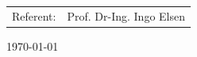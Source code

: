 \begin{titlepage}
	\centering \begin{minipage}[t]{9cm}
		\centering \begin{tabular}{ll}
			Referent: & Prof. Dr-Ing. Ingo Elsen\\
		\end{tabular}
	\end{minipage}

	\vspace{7cm}



	\centering %
	\begin{minipage}[b]{5cm}
			\centering
			\today\\ %
	\end{minipage}

	\restoregeometry
\end{titlepage}

